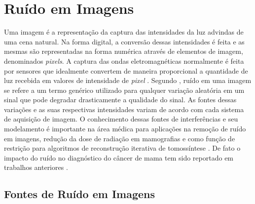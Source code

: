 \chapter[Ruído em Imagens]{Ruído em Imagens}\label{Capitulo4}


Uma imagem é a representação da captura das intensidades da luz advindas de uma cena natural. Na forma digital, a conversão dessas intensidades é feita e as mesmas são representadas na forma numérica através de elementos de imagem, denominados \textit{pixels}. A captura das ondas eletromagnéticas normalmente é feita por sensores que idealmente convertem de maneira proporcional a quantidade de luz recebida em valores de intensidade de \textit{pixel}  \cite{bertalmiodenoising2018}. Segundo , ruído em uma imagem se refere a um termo genérico utilizado para qualquer variação aleatória em um sinal que pode degradar drasticamente a qualidade do sinal. As fontes dessas variações e as suas respectivas intensidades variam de acordo com cada sistema de aquisição de imagem. O conhecimento dessas fontes de interferências e seu modelamento é importante na área médica para aplicações na remoção de ruído em imagens, redução da dose de radiação em mamografias e como função de restrição para algoritmos de reconstrução iterativa de tomossíntese \cite{wu2012dose, romualdo2013mammographic,borges2016method,borges2017pipeline,borges2017method,mackenzie2017characterisation,zheng2018detector}. De fato o impacto do ruído no diagnóstico do câncer de mama tem sido reportado em trabalhos anteriores \cite{haus2000screen,huda2003experimental,ruschin2007dose,saunders2007does, samei2007digital, mackenzie2016relationship}.


\section{Fontes de Ruído em Imagens}

